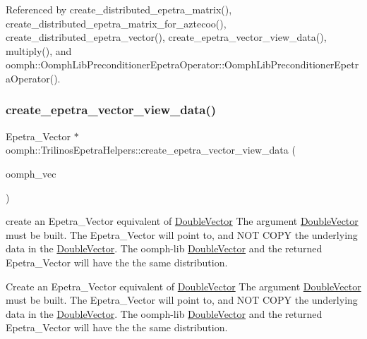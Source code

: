 Referenced by create\+\_\+distributed\+\_\+epetra\+\_\+matrix(), create\+\_\+distributed\+\_\+epetra\+\_\+matrix\+\_\+for\+\_\+aztecoo(), create\+\_\+distributed\+\_\+epetra\+\_\+vector(), create\+\_\+epetra\+\_\+vector\+\_\+view\+\_\+data(), multiply(), and oomph\+::\+Oomph\+Lib\+Preconditioner\+Epetra\+Operator\+::\+Oomph\+Lib\+Preconditioner\+Epetra\+Operator().

\mbox{\label{namespaceoomph_1_1TrilinosEpetraHelpers_acc7e0619f591ab3b4dc04802444dc92b}} 
\subsubsection{\texorpdfstring{create\+\_\+epetra\+\_\+vector\+\_\+view\+\_\+data()}{create\_epetra\_vector\_view\_data()}}
{\footnotesize\ttfamily Epetra\+\_\+\+Vector $\ast$ oomph\+::\+Trilinos\+Epetra\+Helpers\+::create\+\_\+epetra\+\_\+vector\+\_\+view\+\_\+data (\begin{DoxyParamCaption}\item[{\hyperlink{classoomph_1_1DoubleVector}{Double\+Vector} \&}]{oomph\+\_\+vec }\end{DoxyParamCaption})}



create an Epetra\+\_\+\+Vector equivalent of \hyperlink{classoomph_1_1DoubleVector}{Double\+Vector} The argument \hyperlink{classoomph_1_1DoubleVector}{Double\+Vector} must be built. The Epetra\+\_\+\+Vector will point to, and N\+OT C\+O\+PY the underlying data in the \hyperlink{classoomph_1_1DoubleVector}{Double\+Vector}. The oomph-\/lib \hyperlink{classoomph_1_1DoubleVector}{Double\+Vector} and the returned Epetra\+\_\+\+Vector will have the the same distribution. 

Create an Epetra\+\_\+\+Vector equivalent of \hyperlink{classoomph_1_1DoubleVector}{Double\+Vector} The argument \hyperlink{classoomph_1_1DoubleVector}{Double\+Vector} must be built. The Epetra\+\_\+\+Vector will point to, and N\+OT C\+O\+PY the underlying data in the \hyperlink{classoomph_1_1DoubleVector}{Double\+Vector}. The oomph-\/lib \hyperlink{classoomph_1_1DoubleVector}{Double\+Vector} and the returned Epetra\+\_\+\+Vector will have the the same distribution. 

